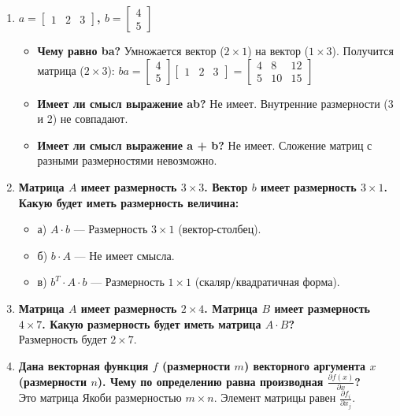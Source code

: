 \documentclass[12pt, a4paper]{article}
\begin{document}
\begin{enumerate}
    \item \textbf{$a=\begin{bmatrix}1 & 2 & 3\end{bmatrix}$, $b=\begin{bmatrix}4 \\ 5\end{bmatrix}$}
    \begin{itemize}
        \item \textbf{Чему равно ba?} Умножается вектор ($2 \times 1$) на вектор ($1 \times 3$). Получится матрица ($2 \times 3$): 
        $ba = \begin{bmatrix} 4 \\ 5 \end{bmatrix} \begin{bmatrix} 1 & 2 & 3 \end{bmatrix} = \begin{bmatrix} 4 & 8 & 12 \\ 5 & 10 & 15 \end{bmatrix}$
        \item \textbf{Имеет ли смысл выражение ab?} Не имеет. Внутренние размерности (3 и 2) не совпадают.
        \item \textbf{Имеет ли смысл выражение a + b?} Не имеет. Сложение матриц с разными размерностями невозможно.
    \end{itemize}

    \item \textbf{Матрица $A$ имеет размерность $3 \times 3$. Вектор $b$ имеет размерность $3 \times 1$. Какую будет иметь размерность величина:}
    \begin{itemize}
        \item а) $A \cdot b$ --- Размерность $3 \times 1$ (вектор-столбец).
        \item б) $b \cdot A$ --- Не имеет смысла.
        \item в) $b^T \cdot A \cdot b$ --- Размерность $1 \times 1$ (скаляр/квадратичная форма).
    \end{itemize}

    \item \textbf{Матрица $A$ имеет размерность $2 \times 4$. Матрица $B$ имеет размерность $4 \times 7$. Какую размерность будет иметь матрица $A \cdot B$?} \\
    Размерность будет $2 \times 7$.

    \item \textbf{Дана векторная функция $f$ (размерности $m$) векторного аргумента $x$ (размерности $n$). Чему по определению равна производная $\frac{\partial f(x)}{\partial x}$?} \\
    Это матрица Якоби размерностью $m \times n$. Элемент матрицы равен $\frac{\partial f_i}{\partial x_j}$.


\end{enumerate}
\end{document}
